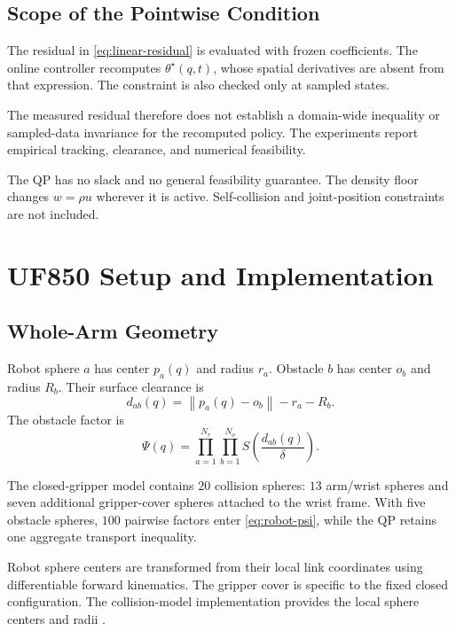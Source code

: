 \documentclass[conference]{IEEEtran}
\newcommand{\norm}[1]{\left\lVert#1\right\rVert}
\begin{document}
\subsection{Scope of the Pointwise Condition}

The residual in \eqref{eq:linear-residual}
is evaluated with frozen coefficients.
The online controller recomputes
$\theta^\star(q,t)$, whose spatial derivatives
are absent from that expression.
The constraint is also checked only at sampled states.

The measured residual therefore does not establish
a domain-wide inequality or sampled-data invariance
for the recomputed policy.
The experiments report empirical tracking,
clearance, and numerical feasibility.

The QP has no slack and no general feasibility
guarantee. The density floor changes $w=\rho u$
wherever it is active. Self-collision and
joint-position constraints are not included.

\section{UF850 Setup and Implementation}
\label{sec:setup}

\subsection{Whole-Arm Geometry}

Robot sphere $a$ has center $p_a(q)$ and radius
$r_a$. Obstacle $b$ has center $o_b$ and radius
$R_b$. Their surface clearance is
\begin{equation}
    d_{ab}(q)=
    \norm{p_a(q)-o_b}-r_a-R_b.
\end{equation}
The obstacle factor is
\begin{equation}
    \Psi(q)=
    \prod_{a=1}^{N_r}\prod_{b=1}^{N_o}
    S\left(\frac{d_{ab}(q)}{\delta}\right).
    \label{eq:robot-psi}
\end{equation}

The closed-gripper model contains $20$ collision
spheres: $13$ arm/wrist spheres and seven additional
gripper-cover spheres attached to the wrist frame.
With five obstacle spheres, $100$ pairwise factors
enter \eqref{eq:robot-psi}, while the QP retains
one aggregate transport inequality.

Robot sphere centers are transformed from their
local link coordinates using differentiable
forward kinematics. The gripper cover is specific
to the fixed closed configuration.
The collision-model implementation provides the
local sphere centers and radii
\cite{xarmimplementation}.
\end{document}
